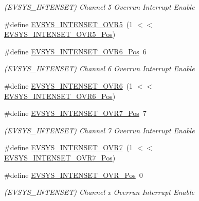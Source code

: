 \begin{DoxyCompactItemize}
\begin{DoxyCompactList}\small\item\em (E\+V\+S\+Y\+S\+\_\+\+I\+N\+T\+E\+N\+S\+ET) Channel 5 Overrun Interrupt Enable \end{DoxyCompactList}\item 
\#define \mbox{\hyperlink{group___s_a_m_d21___e_v_s_y_s_ga9607a4eed7d8af129689fb05ce9c4145}{E\+V\+S\+Y\+S\+\_\+\+I\+N\+T\+E\+N\+S\+E\+T\+\_\+\+O\+V\+R5}}~(1 $<$$<$ \mbox{\hyperlink{group___s_a_m_d21___e_v_s_y_s_ga2a031d969e330e22997d1d3f047712a1}{E\+V\+S\+Y\+S\+\_\+\+I\+N\+T\+E\+N\+S\+E\+T\+\_\+\+O\+V\+R5\+\_\+\+Pos}})
\item 
\#define \mbox{\hyperlink{group___s_a_m_d21___e_v_s_y_s_ga66e3a907b86b2064be2500c8c4aa930c}{E\+V\+S\+Y\+S\+\_\+\+I\+N\+T\+E\+N\+S\+E\+T\+\_\+\+O\+V\+R6\+\_\+\+Pos}}~6
\begin{DoxyCompactList}\small\item\em (E\+V\+S\+Y\+S\+\_\+\+I\+N\+T\+E\+N\+S\+ET) Channel 6 Overrun Interrupt Enable \end{DoxyCompactList}\item 
\#define \mbox{\hyperlink{group___s_a_m_d21___e_v_s_y_s_ga35fb3da4f43283d71d300af74915f743}{E\+V\+S\+Y\+S\+\_\+\+I\+N\+T\+E\+N\+S\+E\+T\+\_\+\+O\+V\+R6}}~(1 $<$$<$ \mbox{\hyperlink{group___s_a_m_d21___e_v_s_y_s_ga66e3a907b86b2064be2500c8c4aa930c}{E\+V\+S\+Y\+S\+\_\+\+I\+N\+T\+E\+N\+S\+E\+T\+\_\+\+O\+V\+R6\+\_\+\+Pos}})
\item 
\#define \mbox{\hyperlink{group___s_a_m_d21___e_v_s_y_s_ga38cd3956f4c2d97e253fc2c9a642af0c}{E\+V\+S\+Y\+S\+\_\+\+I\+N\+T\+E\+N\+S\+E\+T\+\_\+\+O\+V\+R7\+\_\+\+Pos}}~7
\begin{DoxyCompactList}\small\item\em (E\+V\+S\+Y\+S\+\_\+\+I\+N\+T\+E\+N\+S\+ET) Channel 7 Overrun Interrupt Enable \end{DoxyCompactList}\item 
\#define \mbox{\hyperlink{group___s_a_m_d21___e_v_s_y_s_ga673a878b469b02ad1e42b1319da85847}{E\+V\+S\+Y\+S\+\_\+\+I\+N\+T\+E\+N\+S\+E\+T\+\_\+\+O\+V\+R7}}~(1 $<$$<$ \mbox{\hyperlink{group___s_a_m_d21___e_v_s_y_s_ga38cd3956f4c2d97e253fc2c9a642af0c}{E\+V\+S\+Y\+S\+\_\+\+I\+N\+T\+E\+N\+S\+E\+T\+\_\+\+O\+V\+R7\+\_\+\+Pos}})
\item 
\#define \mbox{\hyperlink{group___s_a_m_d21___e_v_s_y_s_ga87a2da8753cbf8b7545463efe086c151}{E\+V\+S\+Y\+S\+\_\+\+I\+N\+T\+E\+N\+S\+E\+T\+\_\+\+O\+V\+R\+\_\+\+Pos}}~0
\begin{DoxyCompactList}\small\item\em (E\+V\+S\+Y\+S\+\_\+\+I\+N\+T\+E\+N\+S\+ET) Channel x Overrun Interrupt Enable \end{DoxyCompactList}\item 
$$
\end{DoxyCompactItemize}
